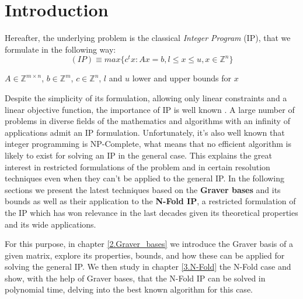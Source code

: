 \chapter{Introduction} \label{1.Introduction}

Hereafter, the underlying problem is the classical \textit{Integer Program} (IP), that we formulate in the following way:
\begin{equation*}
    (IP) \equiv max\{c^tx : Ax = b, l \leq x \leq u, x \in \mathbb{Z}^n \}
\end{equation*}
\vspace{-50pt}
\begin{center}
$A \in \mathbb{Z}^{m \times n}$, $b \in \mathbb{Z}^m$, $c \in \mathbb{Z}^n$, $l$  and $u$ lower and upper bounds for $x$
\end{center}


Despite the simplicity of its formulation, allowing only linear constraints and a linear objective function, the importance of IP is well known . A large number of problems in diverse fields of the mathematics and algorithms with an infinity of applications admit an IP formulation. Unfortunately, it's also well known that integer programming is NP-Complete, what means that no efficient algorithm is likely to exist for solving an IP in the general case. This explains the great interest in restricted formulations of the problem and in certain resolution techniques even when they can't be applied to the general IP. In the following sections we present the latest techniques based on the \textbf{Graver bases} and its bounds as well as their application to the \textbf{N-Fold IP}, a restricted formulation of the IP which has won relevance in the last decades given its theoretical properties and its wide applications. 

For this purpose, in chapter \ref{2.Graver_bases} we introduce the Graver basis of a given matrix, explore its properties, bounds, and how these can be applied for solving the general IP. We then study in chapter \ref{3.N-Fold} the N-Fold case and show, with the help of Graver bases, that the N-Fold IP can be solved in polynomial time, delving into the best known algorithm for this case.


%

